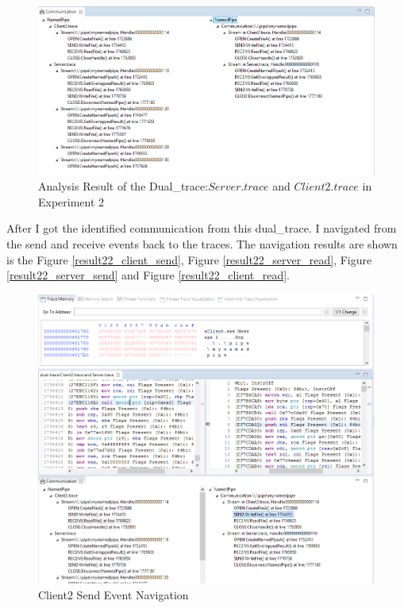 \begin{figure}[H]
\centerline{\includegraphics[scale=0.55]{Figures/result22}}
 \caption{Analysis Result of the Dual\_trace:$Server.trace$ and $Client2.trace$ in Experiment 2}
\label{result22}
\end{figure}

After I got the identified communication from this dual\_trace. I navigated from the send and receive events back to the traces. The navigation results are shown is the Figure \ref{result22_client_send},
Figure \ref{result22_server_read}, 
Figure \ref{result22_server_send} and Figure \ref{result22_client_read}.


\begin{figure}[H]
\centerline{\includegraphics[scale=0.4]{Figures/result22_client_send}}
 \caption{Client2 Send Event Navigation}
\label{result22_client1_send}
\end{figure}

